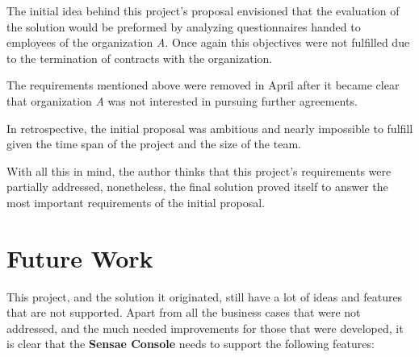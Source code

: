 The initial idea behind this project's proposal envisioned that the evaluation of the solution would be preformed by analyzing questionnaires handed to employees of the organization \textit{A}. Once again this objectives were not fulfilled due to the termination of contracts with the organization.

The requirements mentioned above were removed in April after it became clear that organization \textit{A} was not interested in pursuing further agreements.

In retrospective, the initial proposal was ambitious and nearly impossible to fulfill given the time span of the project and the size of the team.

With all this in mind, the author thinks that this project's requirements were partially addressed, nonetheless, the final solution proved itself to answer the most important requirements of the initial proposal.

\section{Future Work}
\label{sec:conclusion:future}

This project, and the solution it originated, still have a lot of ideas and features that are not supported. Apart from all the business cases that were not addressed, and the much needed improvements for those that were developed, it is clear that the \textbf{Sensae Console} needs to support the following features:

